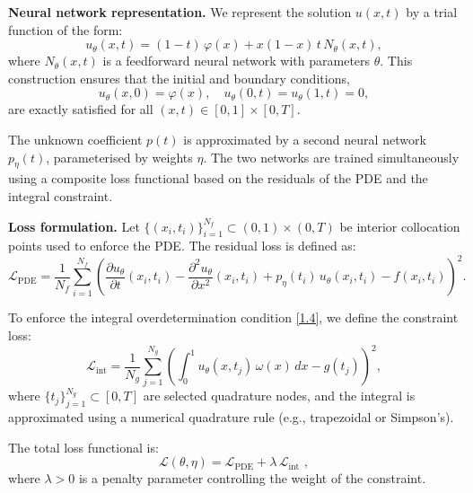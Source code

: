 \documentclass[reqno]{amsart}
\begin{document}
\medskip

\textbf{Neural network representation.}
We represent the solution \( u(x,t) \) by a trial function of the form:
\begin{equation} \label{eq:trial}
u_\theta(x,t) = (1 - t)\, \varphi(x) + x(1 - x)\, t\, N_\theta(x,t),
\end{equation}
where \( N_\theta(x,t) \) is a feedforward neural network with parameters \( \theta \). This construction ensures that the initial and boundary conditions,
\[
u_\theta(x,0) = \varphi(x), \quad u_\theta(0,t) = u_\theta(1,t) = 0,
\]
are exactly satisfied for all \( (x,t) \in [0,1] \times [0,T] \).

The unknown coefficient \( p(t) \) is approximated by a second neural network \( p_\eta(t) \), parameterised by weights \( \eta \). The two networks are trained simultaneously using a composite loss functional based on the residuals of the PDE and the integral constraint.

\medskip

\textbf{Loss formulation.}
Let \( \{(x_i, t_i)\}_{i=1}^{N_f} \subset (0,1) \times (0,T) \) be interior collocation points used to enforce the PDE. The residual loss is defined as:
\begin{equation} \label{eq:pinn_pde}
\mathcal{L}_{\mathrm{PDE}} = \frac{1}{N_f} \sum_{i=1}^{N_f}
\left( \frac{\partial u_\theta}{\partial t}(x_i, t_i) - \frac{\partial^2 u_\theta}{\partial x^2}(x_i, t_i)
+ p_\eta(t_i)\, u_\theta(x_i, t_i) - f(x_i, t_i) \right)^2.
\end{equation}

To enforce the integral overdetermination condition \eqref{1.4}, we define the constraint loss:
\begin{equation} \label{eq:pinn_integral}
\mathcal{L}_{\mathrm{int}} = \frac{1}{N_g} \sum_{j=1}^{N_g}
\left( \int_0^1 u_\theta(x, t_j)\, \omega(x)\, dx - g(t_j) \right)^2,
\end{equation}
where \( \{t_j\}_{j=1}^{N_g} \subset [0,T] \) are selected quadrature nodes, and the integral is approximated using a numerical quadrature rule (e.g., trapezoidal or Simpson’s).

The total loss functional is:
\begin{equation} \label{eq:pinn_loss}
\mathcal{L}(\theta, \eta) = \mathcal{L}_{\mathrm{PDE}} + \lambda\, \mathcal{L}_{\mathrm{int}}\,\,,
\end{equation}
where \( \lambda > 0 \) is a penalty parameter controlling the weight of the constraint.
\end{document}
